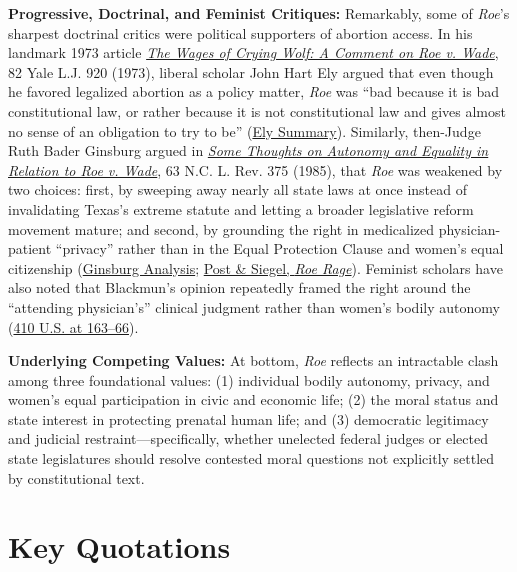 \documentclass[12pt]{article}
\begin{document}
\textbf{Progressive, Doctrinal, and Feminist Critiques:} Remarkably, some of \textit{Roe}'s sharpest doctrinal critics were political supporters of abortion access. In his landmark 1973 article \href{https://www.aei.org/wp-content/uploads/2023/07/AEIReprint015.pdf}{\textit{The Wages of Crying Wolf: A Comment on Roe v. Wade}}, 82 Yale L.J. 920 (1973), liberal scholar John Hart Ely argued that even though he favored legalized abortion as a policy matter, \textit{Roe} was ``bad because it is bad constitutional law, or rather because it is not constitutional law and gives almost no sense of an obligation to try to be'' (\href{https://en.wikipedia.org/wiki/John_Hart_Ely}{Ely Summary}). Similarly, then-Judge Ruth Bader Ginsburg argued in \href{https://scholarship.law.unc.edu/nclr/vol63/iss2/4/}{\textit{Some Thoughts on Autonomy and Equality in Relation to Roe v. Wade}}, 63 N.C. L. Rev. 375 (1985), that \textit{Roe} was weakened by two choices: first, by sweeping away nearly all state laws at once instead of invalidating Texas's extreme statute and letting a broader legislative reform movement mature; and second, by grounding the right in medicalized physician-patient ``privacy'' rather than in the Equal Protection Clause and women's equal citizenship (\href{https://www.govinfo.gov/content/pkg/GPO-CHRG-GINSBURG/pdf/GPO-CHRG-GINSBURG-3-2-1-2.pdf}{Ginsburg Analysis}; \href{https://law.yale.edu/sites/default/files/documents/pdf/Faculty/Siegel_RoeRageDemocraticConstitutionalismAndBacklash.pdf}{Post \& Siegel, \textit{Roe Rage}}). Feminist scholars have also noted that Blackmun's opinion repeatedly framed the right around the ``attending physician's'' clinical judgment rather than women's bodily autonomy (\href{https://supreme.justia.com/cases/federal/us/410/113/}{410 U.S. at 163--66}).

\textbf{Underlying Competing Values:} At bottom, \textit{Roe} reflects an intractable clash among three foundational values: (1) individual bodily autonomy, privacy, and women's equal participation in civic and economic life; (2) the moral status and state interest in protecting prenatal human life; and (3) democratic legitimacy and judicial restraint---specifically, whether unelected federal judges or elected state legislatures should resolve contested moral questions not explicitly settled by constitutional text.

\section{Key Quotations}
\end{document}
